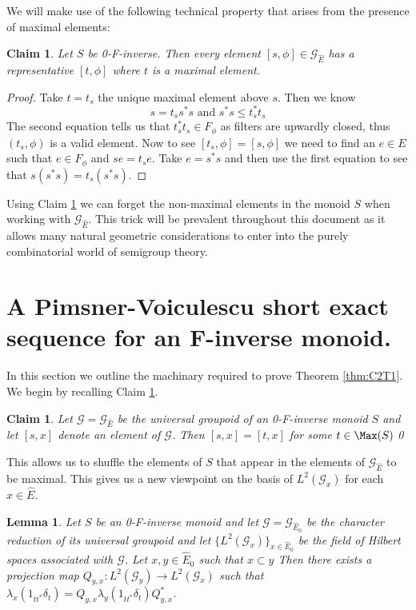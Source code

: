 \documentclass[11pt]{amsart}
\theoremstyle{plain}
\newtheorem{lemma}[theorem]{Lemma}%
\newtheorem{claim}[theorem]{Claim}%
\theoremstyle{definition}%
\theoremstyle{remark}%
\newcommand{\G}{\mathcal{G}}
\newcommand{\E}{\widehat{E}}
\begin{document}
We will make use of the following technical property that arises from the presence of maximal elements:

\begin{claim}\label{MainClaim:C1}
Let $S$ be 0-F-inverse. Then every element $[s,\phi] \in \G_{\E}$ has a representative $[t,\phi]$ where $t$ is a maximal element.
\end{claim}
\begin{proof}
Take $t=t_{s}$ the unique maximal element above $s$. Then we know 
\begin{equation*}
s = t_{s}s^{*}s \mbox{ and } s^{*}s \leq t_{s}^{*}t_{s}
\end{equation*} 
The second equation tells us that $t_{s}^{*}t_{s} \in F_{\phi}$ as filters are upwardly closed, thus $(t_{s},\phi)$ is a valid element. Now to see $[t_{s},\phi]=[s,\phi]$ we need to find an $e \in E$ such that $e \in F_{\phi}$ and $se=t_{s}e$. Take $e=s^{*}s$ and then use the first equation to see that $s(s^{*}s)=t_{s}(s^{*}s)$.
\end{proof}
Using Claim \ref{MainClaim:C1} we can forget the non-maximal elements in the monoid $S$ when working with $\G_{\E}$. This trick will be prevalent throughout this document as it allows many natural geometric considerations to enter into the purely combinatorial world of semigroup theory.

\section{A Pimsner-Voiculescu short exact sequence for an F-inverse monoid.}

In this section we outline the machinary required to prove Theorem \ref{thm:C2T1}. We begin by recalling Claim \ref{MainClaim:C1}.
\begin{claim}
Let $\mathcal{G}=\mathcal{G}_{\widehat{E}}$ be the universal groupoid of an 0-F-inverse monoid $S$ and let $[s,x]$ denote an element of $\mathcal{G}$. Then $[s,x]=[t,x]$ for some $t \in \Max(S)$\qed
\end{claim}

This allows us to shuffle the elements of $S$ that appear in the elements of $\mathcal{G}_{\widehat{E}}$ to be maximal. This gives us a new viewpoint on the basis of $L^{2}(\mathcal{G}_{x})$ for each $x \in \widehat{E}$. 

\begin{lemma}\label{lem:L2}
Let $S$ be an 0-F-inverse monoid and let $\G=\G_{\E_{0}}$ be the character reduction of its universal groupoid and let $\lbrace L^{2}(\mathcal{G}_{x}) \rbrace_{x \in \E_{0}}$ be the field of Hilbert spaces associated with $\mathcal{G}$. Let $x,y \in \E_{0}$ such that $x \subset y$ Then there exists a projection map $Q_{y,x}: L^{2}(\mathcal{G}_{y}) \rightarrow L^{2}(\mathcal{G}_{x})$ such that $\lambda_{x}(1_{tt^{*}}\delta_{t}) = Q_{y,x}\lambda_{y}(1_{tt^{*}}\delta_{t})Q_{y,x}^{*}$.
\end{lemma}
\end{document}
